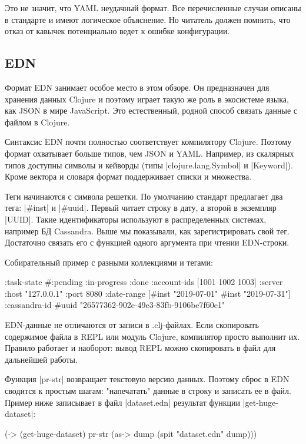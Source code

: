 Это не значит, что YAML неудачный формат. Все перечисленные случаи описаны в
стандарте и имеют логическое объяснение. Но читатель должен помнить, что отказ
от кавычек потенциально ведет к ошибке конфигурации.

\subsection{EDN}

Формат EDN занимает особое место в этом обзоре. Он предназначен для хранения
данных Clojure и поэтому играет такую же роль в экосистеме языка, как JSON в
мире JavaScript. Это естественный, родной способ связать данные с файлом в
Clojure.

Синтаксис EDN почти полностью соответствует компилятору Clojure. Поэтому формат
охватывает больше типов, чем JSON и YAML. Например, из скалярных типов доступны
символы и кейворды (типы \spverb|clojure.lang.Symbol| и \spverb|Keyword|). Кроме вектора и
словаря формат поддерживает списки и множества.

Теги начинаются с символа решетки. По умолчанию стандарт предлагает два тега:
\spverb|#inst| и \spverb|#uuid|. Первый читает строку в дату, а второй в экземпляр
\spverb|UUID|. Такие идентификаторы используют в распределенных системах, например БД
Cassandra. Выше мы показывали, как зарегистрировать свой тег. Достаточно связать
его с функцией одного аргумента при чтении EDN-строки.

Собирательный пример с разными коллекциями и тегами:

\begin{code}
{:task-state #{:pending :in-progress :done}
 :account-ids [1001 1002 1003]
 :server {:host "127.0.0.1" :port 8080}
 :date-range [#inst "2019-07-01" #inst "2019-07-31"]
 :cassandra-id #uuid "26577362-902e-49e3-83fb-9106be7f60e1"}
\end{code}

EDN-данные не отличаются от записи в .clj-файлах. Если скопировать содержимое
файла в REPL или модуль Clojure, компилятор просто выполнит их. Правило работает
и наоборот: вывод REPL можно скопировать в файл для дальнейшей работы.

Функция \spverb|pr-str| возвращает текстовую версию данных. Поэтому сброс в EDN
сводится к простым шагам: "напечатать" данные в строку и записать ее в
файл. Пример ниже записывает в файл \spverb|dataset.edn| результат функции
\spverb|get-huge-dataset|:

\begin{code}
(-> (get-huge-dataset)
    pr-str
    (as-> dump
        (spit "dataset.edn" dump)))
\end{code}

